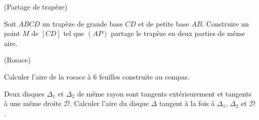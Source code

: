 \documentclass[a4paper,11pt,reqno]{amsart}
\begin{document}
\begin{exo} (Partage de trapèze)

  Soit $ABCD$ un trapèze de grande base $CD$ et de petite base $AB$. Construire un point $M$ de $[CD]$ tel que $(AP)$ partage le trapèze en deux parties de même aire.
\end{exo}

\begin{exo} (Rosace)

  Calculer l'aire de la rosace à 6 feuilles construite au compas.
\end{exo}

\begin{exo}

  Deux disques $\Delta_1$ et $\Delta_2$ de même rayon sont tangents extérieurement et tangents à une même droite $\mathcal D$. Calculer l'aire du disque $\Delta$ tangent à la fois à $\Delta_1$, $\Delta_2$ et $\mathcal D$.
\end{exo}
\end{document}
